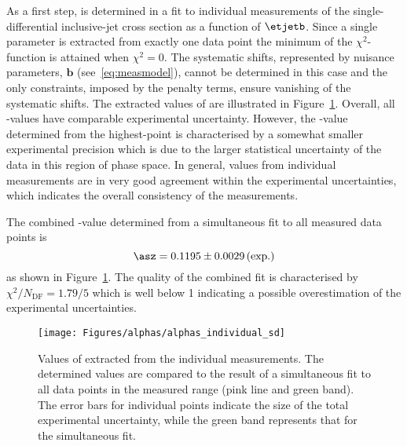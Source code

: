 As a first step, \asz is determined in a fit to individual measurements of the single-differential inclusive-jet cross section as a function of $\etjetb$. Since a single parameter is extracted from exactly one data point the minimum of the $\chi^2$-function is attained when $\chi^2=0$. The systematic shifts, represented by nuisance parameters, $\mathbf{b}$ (see~\eqref{eq:measmodel}), cannot be determined in this case and the only constraints, imposed by the penalty terms, ensure vanishing of the systematic shifts. The extracted values of \asz are illustrated in Figure~\ref{fig:alphassinglediffindividual}. Overall, all \as-values have comparable experimental uncertainty. However, the \as-value determined from the highest-\etjetb point is characterised by a somewhat smaller experimental precision which is due to the larger statistical uncertainty of the data in this region of phase space. In general, \as values from individual measurements are in very good agreement within the experimental uncertainties, which indicates the overall consistency of the measurements.

The combined \asz-value determined from a simultaneous fit to all measured data points is
\begin{equation}
 \asz = 0.1195 \pm 0.0029 \left( \text{exp.} \right) %
 \label{eq:assingledifval}
\end{equation}
as shown in Figure~\ref{fig:alphassinglediffindividual}. The quality of the combined fit is characterised by $\chi^2/N_\text{DF}=1.79/5$ which is well below 1 indicating a possible overestimation of the experimental uncertainties.

\begin{figure}[t]
 \centering
 \texttt{[image: Figures/alphas/alphas\_individual\_sd]}
 \caption{Values of \asz extracted from the individual \dsdetjetb measurements. The determined values are compared to the result of a simultaneous fit to all data points in the measured \etjetb range (pink line and green band). The error bars for individual points indicate the size of the total experimental uncertainty, while the green band represents that for the simultaneous fit.}
 \label{fig:alphassinglediffindividual}
\end{figure}

